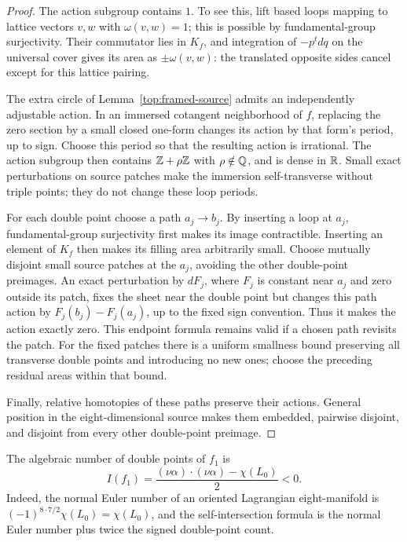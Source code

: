 \begin{proof}
The action subgroup contains $1$.  To see this, lift based loops
mapping to lattice vectors $v,w$ with $\omega(v,w)=1$; this is
possible by fundamental-group surjectivity.  Their commutator lies
in $K_f$, and integration of $-p^t dq$ on the universal cover gives
its area as $\pm\omega(v,w)$: the translated opposite sides cancel
except for this lattice pairing.

The extra circle of Lemma~\ref{top:framed-source} admits an
independently adjustable action.  In an immersed cotangent
neighborhood of $f$, replacing the zero section by a small closed
one-form changes its action by that form's period, up to sign.
Choose this period so that the resulting action is irrational.
The action subgroup then contains $\mathbb Z+\rho\mathbb Z$ with
$\rho\notin\mathbb Q$, and is dense in $\mathbb R$.  Small exact perturbations
on source patches make the immersion self-transverse without triple
points; they do not change these loop periods.

For each double point choose a path $a_j\to b_j$.  By inserting a
loop at $a_j$, fundamental-group surjectivity first makes its image
contractible.  Inserting an element of $K_f$ then makes its filling
area arbitrarily small.  Choose mutually disjoint small source
patches at the $a_j$, avoiding the other double-point preimages.
An exact perturbation by $dF_j$, where $F_j$ is constant near $a_j$
and zero outside its patch, fixes the sheet near the double point
but changes this path action by $F_j(b_j)-F_j(a_j)$, up to the
fixed sign convention.  Thus it makes the action exactly zero.
This endpoint formula remains valid if a chosen path revisits the
patch.  For the fixed patches there is a uniform smallness bound
preserving all transverse double points and introducing no new
ones; choose the preceding residual areas within that bound.

Finally, relative homotopies of these paths preserve their actions.
General position in the eight-dimensional source makes them
embedded, pairwise disjoint, and disjoint from every other
double-point preimage.
\end{proof}

The algebraic number of double points of $f_1$ is
\begin{equation}\label{top:negative-index}
 I(f_1)=\frac{(\nu\alpha)\cdot(\nu\alpha)-\chi(L_0)}2<0.
\end{equation}
Indeed, the normal Euler number of an oriented Lagrangian
eight-manifold is $(-1)^{8\cdot7/2}\chi(L_0)=\chi(L_0)$, and
the self-intersection formula is the normal Euler number plus twice
the signed double-point count.

